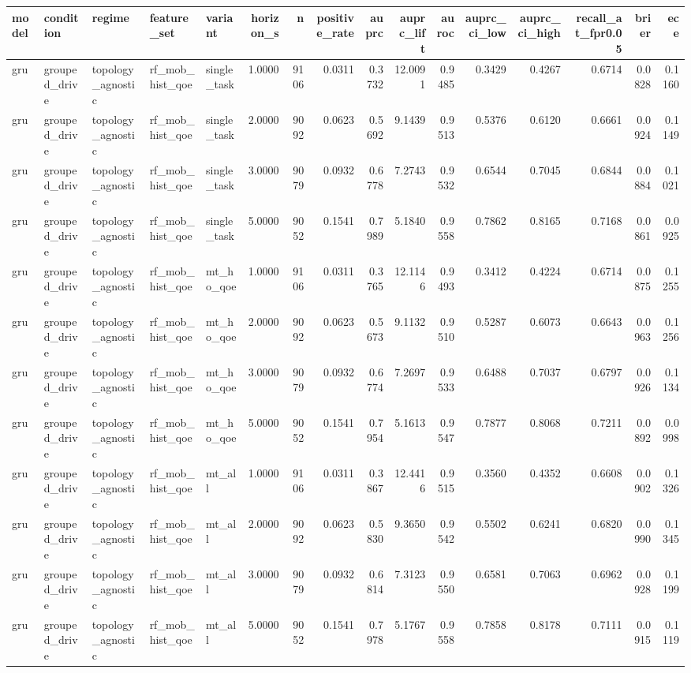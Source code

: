 \begin{tabular}{lllllrrrrrrrrrrr}
\toprule
model & condition & regime & feature\_set & variant & horizon\_s & n & positive\_rate & auprc & auprc\_lift & auroc & auprc\_ci\_low & auprc\_ci\_high & recall\_at\_fpr0.05 & brier & ece \\
\midrule
gru & grouped\_drive & topology\_agnostic & rf\_mob\_hist\_qoe & single\_task & 1.0000 & 9106 & 0.0311 & 0.3732 & 12.0091 & 0.9485 & 0.3429 & 0.4267 & 0.6714 & 0.0828 & 0.1160 \\
gru & grouped\_drive & topology\_agnostic & rf\_mob\_hist\_qoe & single\_task & 2.0000 & 9092 & 0.0623 & 0.5692 & 9.1439 & 0.9513 & 0.5376 & 0.6120 & 0.6661 & 0.0924 & 0.1149 \\
gru & grouped\_drive & topology\_agnostic & rf\_mob\_hist\_qoe & single\_task & 3.0000 & 9079 & 0.0932 & 0.6778 & 7.2743 & 0.9532 & 0.6544 & 0.7045 & 0.6844 & 0.0884 & 0.1021 \\
gru & grouped\_drive & topology\_agnostic & rf\_mob\_hist\_qoe & single\_task & 5.0000 & 9052 & 0.1541 & 0.7989 & 5.1840 & 0.9558 & 0.7862 & 0.8165 & 0.7168 & 0.0861 & 0.0925 \\
gru & grouped\_drive & topology\_agnostic & rf\_mob\_hist\_qoe & mt\_ho\_qoe & 1.0000 & 9106 & 0.0311 & 0.3765 & 12.1146 & 0.9493 & 0.3412 & 0.4224 & 0.6714 & 0.0875 & 0.1255 \\
gru & grouped\_drive & topology\_agnostic & rf\_mob\_hist\_qoe & mt\_ho\_qoe & 2.0000 & 9092 & 0.0623 & 0.5673 & 9.1132 & 0.9510 & 0.5287 & 0.6073 & 0.6643 & 0.0963 & 0.1256 \\
gru & grouped\_drive & topology\_agnostic & rf\_mob\_hist\_qoe & mt\_ho\_qoe & 3.0000 & 9079 & 0.0932 & 0.6774 & 7.2697 & 0.9533 & 0.6488 & 0.7037 & 0.6797 & 0.0926 & 0.1134 \\
gru & grouped\_drive & topology\_agnostic & rf\_mob\_hist\_qoe & mt\_ho\_qoe & 5.0000 & 9052 & 0.1541 & 0.7954 & 5.1613 & 0.9547 & 0.7877 & 0.8068 & 0.7211 & 0.0892 & 0.0998 \\
gru & grouped\_drive & topology\_agnostic & rf\_mob\_hist\_qoe & mt\_all & 1.0000 & 9106 & 0.0311 & 0.3867 & 12.4416 & 0.9515 & 0.3560 & 0.4352 & 0.6608 & 0.0902 & 0.1326 \\
gru & grouped\_drive & topology\_agnostic & rf\_mob\_hist\_qoe & mt\_all & 2.0000 & 9092 & 0.0623 & 0.5830 & 9.3650 & 0.9542 & 0.5502 & 0.6241 & 0.6820 & 0.0990 & 0.1345 \\
gru & grouped\_drive & topology\_agnostic & rf\_mob\_hist\_qoe & mt\_all & 3.0000 & 9079 & 0.0932 & 0.6814 & 7.3123 & 0.9550 & 0.6581 & 0.7063 & 0.6962 & 0.0928 & 0.1199 \\
gru & grouped\_drive & topology\_agnostic & rf\_mob\_hist\_qoe & mt\_all & 5.0000 & 9052 & 0.1541 & 0.7978 & 5.1767 & 0.9558 & 0.7858 & 0.8178 & 0.7111 & 0.0915 & 0.1119 \\
\bottomrule
\end{tabular}
